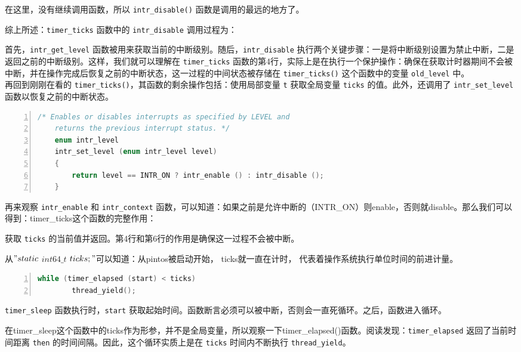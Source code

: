 \documentclass{article}
\begin{document}
	在这里，没有继续调用函数，所以 \texttt{intr\_disable()} 函数是调用的最远的地方了。
	
	综上所述：\texttt{timer\_ticks} 函数中的 \texttt{intr\_disable} 调用过程为：
	
	首先，\texttt{intr\_get\_level} 函数被用来获取当前的中断级别。随后，\texttt{intr\_disable} 执行两个关键步骤：一是将中断级别设置为禁止中断，二是返回之前的中断级别。这样，我们就可以理解在 \texttt{timer\_ticks} 函数的第4行，实际上是在执行一个保护操作：确保在获取计时器期间不会被中断，并在操作完成后恢复之前的中断状态，这一过程的中间状态被存储在 \texttt{timer\_ticks()} 这个函数中的变量 \texttt{old\_level} 中。\\[1em]
	
	再回到刚刚在看的 \texttt{timer\_ticks()}，其函数的剩余操作包括：使用局部变量 \texttt{t} 获取全局变量 \texttt{ticks} 的值。此外，还调用了 \texttt{intr\_set\_level} 函数以恢复之前的中断状态。
	
	\begin{lstlisting}[xleftmargin = 4em,xrightmargin = 4em, aboveskip = 1em, numbers = left, language = C,title=\texttt{set\_level()}函数]
    /* Enables or disables interrupts as specified by LEVEL and
    returns the previous interrupt status. */
    enum intr_level
    intr_set_level (enum intr_level level)
    {
    	return level == INTR_ON ? intr_enable () : intr_disable ();
    }
	\end{lstlisting}
	
	再来观察 \texttt{intr\_enable} 和 \texttt{intr\_context} 函数，可以知道：如果之前是允许中断的（INTR\_ON）则enable，否则就disable。那么我们可以得到：timer\_ticks这个函数的完整作用：
	
	获取 \texttt{ticks} 的当前值并返回。第4行和第6行的作用是确保这一过程不会被中断。
	
	从$"static$ $int64\_t$ $ticks;"$可以知道：从pintos被启动开始， ticks就一直在计时， 代表着操作系统执行单位时间的前进计量。
	
	\begin{lstlisting}[xleftmargin = 4em,xrightmargin = 4em, aboveskip = 1em, numbers = left, language = C,title=\texttt{timer\_sleep()}函数中的部分代码]
    while (timer_elapsed (start) < ticks)
        thread_yield();
	\end{lstlisting}
	
	\texttt{timer\_sleep} 函数执行时，\texttt{start} 获取起始时间。函数断言必须可以被中断，否则会一直死循环。之后，函数进入循环。
	
	在timer\_sleep这个函数中的ticks作为形参，并不是全局变量，所以观察一下timer\_elapsed()函数。阅读发现：\texttt{timer\_elapsed} 返回了当前时间距离 \texttt{then} 的时间间隔。因此，这个循环实质上是在 \texttt{ticks} 时间内不断执行 \texttt{thread\_yield}。\\[1em]
	
\end{document}
